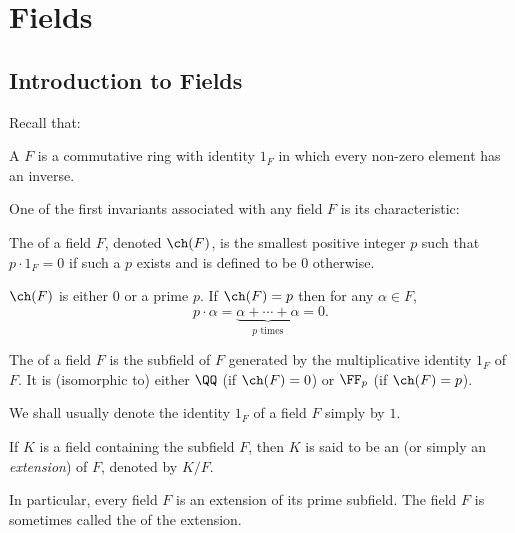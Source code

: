 \chapter{Fields}\label{chap:fields}
\section{Introduction to Fields}
Recall that:
\begin{definition}[Field]
A  $F$ is a commutative ring with identity $1_F$ in which every non-zero element has an inverse.
\end{definition}


One of the first invariants associated with any field $F$ is its characteristic:

\begin{definition}[Characteristic]
The  of a field $F$, denoted $\ch(F)$, is the smallest positive integer $p$ such that $p\cdot 1_F=0$ if such a $p$ exists and is defined to be $0$ otherwise.
\end{definition}

\begin{proposition}
$\ch(F)$ is either $0$ or a prime $p$. If $\ch(F)=p$ then for any $\alpha\in F$,
\[p\cdot\alpha=\underbrace{\alpha+\cdots+\alpha}_\text{$p$ times}=0.\]
\end{proposition}

\begin{definition}
The  of a field $F$ is the subfield of $F$ generated by the multiplicative identity $1_F$ of $F$. It is (isomorphic to) either $\QQ$ (if $\ch(F)=0$) or $\FF_p$ (if $\ch(F)=p$).
\end{definition}

\begin{notation}
We shall usually denote the identity $1_F$ of a field $F$ simply by $1$.
\end{notation}

\begin{definition}
If $K$ is a field containing the subfield $F$, then $K$ is said to be an  (or simply an \emph{extension}) of $F$, denoted by $K/F$.
\end{definition}

In particular, every field $F$ is an extension of its prime subfield. The field $F$ is sometimes called the  of the extension.

